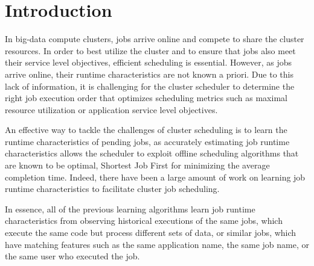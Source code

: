 \section{Introduction}
\label{sec:intro}

In big-data compute clusters, jobs arrive online and compete to share the
cluster resources. In order to best utilize the cluster and to ensure
that jobs also meet their service level objectives, efficient
scheduling is essential. However, as jobs arrive online, their runtime
characteristics are not known a priori. Due to this lack of
information, it is challenging for the cluster scheduler to determine
the right job execution order that optimizes scheduling metrics
such as maximal resource utilization or application service level objectives.

An effective way to tackle the challenges of cluster scheduling is to
learn the runtime characteristics of pending jobs, as accurately
estimating job runtime characteristics allows the scheduler to
exploit offline scheduling algorithms that are known to be optimal,
\eg Shortest Job First for minimizing the average completion time.
%
Indeed, there have been a large amount of work \cite{tetrisched,
  morpheus, 3Sigma, IfYouAreLateDontBlameUs:socc14,
  DontCryOverSpilledRecords, corral, perforator:socc2016, cdef:atc18} on learning
job runtime characteristics to facilitate cluster job
scheduling.

In essence, all of the previous learning algorithms learn job
runtime characteristics from observing historical executions of the
same jobs, which execute the same code but process different sets of
data, or similar jobs, which have matching features such as the same
application name, the same job name, or the same user who executed the
job.

